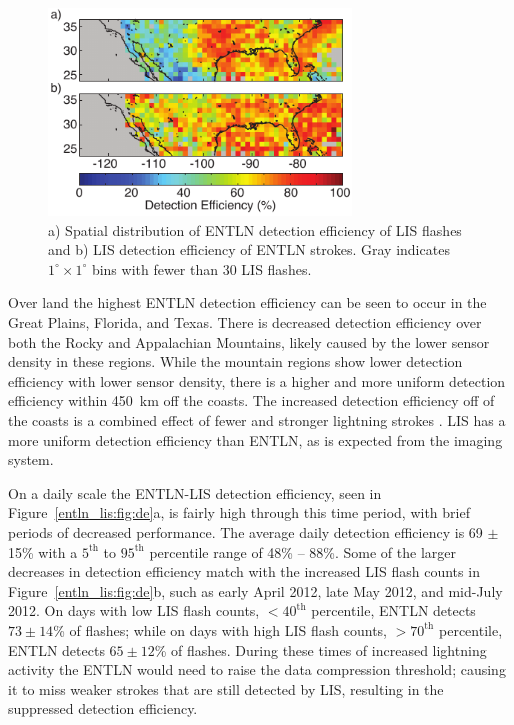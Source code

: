 \begin{figure}[t]
   \centering
   \noindent\includegraphics[width=19pc,angle=0]{entln_lis/Figures/map.pdf}
   \caption{a) Spatial distribution of ENTLN detection efficiency of LIS flashes and
   		b) LIS detection efficiency of ENTLN strokes.
   		Gray indicates $1^\circ \times 1^\circ$ bins with fewer than 30 LIS flashes.
		}
   \label{entln_lis:fig:map}
\end{figure}

Over land the highest ENTLN detection efficiency can be seen to occur in the Great Plains, Florida, and Texas.
There is decreased detection efficiency over both the Rocky and Appalachian Mountains, likely caused by the lower sensor density in these regions.
While the mountain regions show lower detection efficiency with lower sensor density, there is a higher and more uniform detection efficiency within 450~km off the coasts.
The increased detection efficiency off of the coasts is a combined effect of fewer and stronger lightning strokes \citep{Hutchins2013, Rudlosky2010}.
LIS has a more uniform detection efficiency than ENTLN, as is expected from the imaging system.

On a daily scale the ENTLN-LIS detection efficiency, seen in Figure~\ref{entln_lis:fig:de}a, is fairly high through this time period, with brief periods of decreased performance.
The average daily detection efficiency is 69 $\pm$ 15\% with a $5^\text{th}$ to $95^\text{th}$ percentile range of 48\% -- 88\%.
Some of the larger decreases in detection efficiency match with the increased LIS flash counts in Figure~\ref{entln_lis:fig:de}b, such as early April 2012, late May 2012, and mid-July 2012.
On days with low LIS flash counts, $<40^\text{th}$ percentile, ENTLN detects $73\pm14$\% of flashes; while on days with high LIS flash counts, $>70^\text{th}$ percentile, ENTLN detects $65\pm12$\% of flashes.
During these times of increased lightning activity the ENTLN would need to raise the data compression threshold; causing it to miss weaker strokes that are still detected by LIS, resulting in the suppressed detection efficiency.

